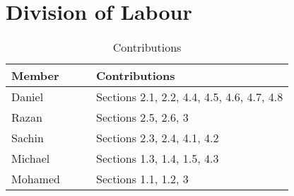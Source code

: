 \documentclass[12pt]{article}
\begin{document}
    \section{Division of Labour}
    \label{sec:division_of_labour}
    \begin{table}[H]
        \begin{center}
            \begin{tabular}{| p{0.30\linewidth} | p{0.70\linewidth} |}
                \hline
                \textbf{Member} & \textbf{Contributions}\\
                \hline
                Daniel & Sections 2.1, 2.2, 4.4, 4.5, 4.6, 4.7, 4.8\\
                
                Razan & Sections 2.5, 2.6, 3\\
                
                Sachin & Sections 2.3, 2.4, 4.1, 4.2\\
                
                Michael & Sections 1.3, 1.4, 1.5, 4.3\\
                
                Mohamed & Sections 1.1, 1.2, 3\\
                \hline
            \end{tabular}
            \caption{Contributions} \label{tab:Contributions}
        \end{center}
    \end{table}
    
\end{document}
